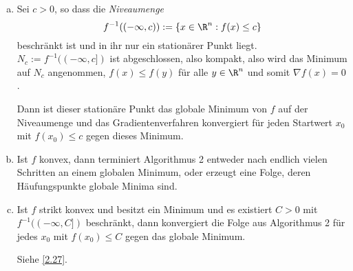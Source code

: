\begin{kor} \label{2.26}
	\begin{enumerate}[(a)]
		\item
			Sei $c > 0$, so dass die \emph{Niveaumenge}
			\[
				f^{-1}((-\infty, c))
				:= \{ x \in \R^n : f(x) \le c \}
			\]
			beschränkt ist und in ihr nur ein stationärer Punkt liegt.
			$N_c := f^{-1}((-\infty,c])$ ist abgeschlossen, also kompakt, also wird das Minimum auf $N_c$ angenommen, $f(x) \le f(y)$ für alle $y \in \R^n$ und somit $\nabla f(x) = 0$.

			Dann ist dieser stationäre Punkt das globale Minimum von $f$ auf der Niveaumenge und das Gradientenverfahren konvergiert für jeden Startwert $x_0$ mit $f(x_0) \le c$ gegen dieses Minimum.
		\item
			Ist $f$ konvex, dann terminiert Algorithmus 2 %
			entweder nach endlich vielen Schritten an einem globalen Minimum, oder erzeugt eine Folge, deren Häufungspunkte globale Minima sind.
		\item
			Ist $f$ strikt konvex und besitzt ein Minimum und es existiert $C > 0$ mit $f^{-1}((-\infty,C])$ beschränkt, dann konvergiert die Folge aus Algorithmus 2 %
			für jedes $x_0$ mit $f(x_0) \le C$ gegen das globale Minimum.

			Siehe \ref{2.27}.
	\end{enumerate}
\end{kor}


